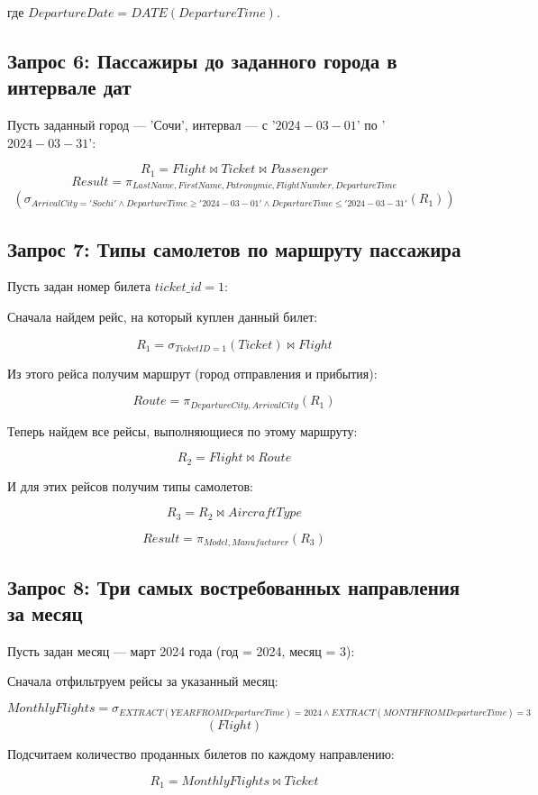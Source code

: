 \documentclass[a4paper,12pt]{article}
\begin{document}
где $DepartureDate = DATE(DepartureTime)$.

\subsection*{Запрос 6: Пассажиры до заданного города в интервале дат}
Пусть заданный город — 'Сочи', интервал — с '$2024-03-01$' по '$2024-03-31$':

\[
R_1 = Flight \bowtie Ticket \bowtie Passenger
\]
\[
Result = \pi_{LastName, FirstName, Patronymic, FlightNumber, DepartureTime}
\]
\[
( \sigma_{ArrivalCity='Sochi' \land DepartureTime \ge '2024-03-01' \land DepartureTime \le '2024-03-31'}(R_1))
\]

\subsection*{Запрос 7: Типы самолетов по маршруту пассажира}
Пусть задан номер билета $ticket\_id = 1$:

Сначала найдем рейс, на который куплен данный билет:

\[
R_1 = \sigma_{TicketID=1}(Ticket) \bowtie Flight
\]

Из этого рейса получим маршрут (город отправления и прибытия):

\[
Route = \pi_{DepartureCity, ArrivalCity}(R_1)
\]

Теперь найдем все рейсы, выполняющиеся по этому маршруту:

\[
R_2 = Flight \bowtie Route
\]

И для этих рейсов получим типы самолетов:

\[
R_3 = R_2 \bowtie AircraftType
\]

\[
Result = \pi_{Model, Manufacturer}(R_3)
\]

\subsection*{Запрос 8: Три самых востребованных направления за месяц}
Пусть задан месяц — март 2024 года (год = 2024, месяц = 3):

Сначала отфильтруем рейсы за указанный месяц:

\[
MonthlyFlights = \sigma_{EXTRACT(YEAR FROM DepartureTime)=2024 \land EXTRACT(MONTH FROM DepartureTime)=3}
\]
\[
(Flight)
\]

Подсчитаем количество проданных билетов по каждому направлению:

\[
R_1 = MonthlyFlights \bowtie Ticket
\]
\end{document}
